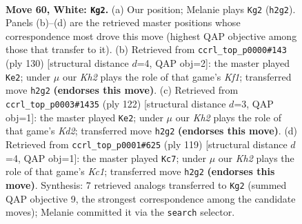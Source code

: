 \documentclass[11pt]{article}
\begin{document}
\clearpage

\begin{figure}[p]\centering
\begin{subfigure}{0.46\textwidth}\centering
\resizebox{\linewidth}{!}{%
\newchessgame
\chessboard[
  setfen={2k5/5R2/2r5/8/8/8/7K/8 w - - 0 60},
  showmover=false,
  pgfstyle=straightmove, color=movearrow, markmove={h2-g2}
]}
\caption{}
\end{subfigure}\hfill
\begin{subfigure}{0.46\textwidth}\centering
\resizebox{\linewidth}{!}{%
\newchessgame
\chessboard[
  setfen={8/8/1R6/6kr/8/8/8/5K2 w - - 1 66},
  showmover=false,
  pgfstyle=straightmove, color=movearrow, markmove={f1-e2}
]}
\caption{}
\end{subfigure}
\\[4pt]
\begin{subfigure}{0.46\textwidth}\centering
\resizebox{\linewidth}{!}{%
\newchessgame
\chessboard[
  setfen={6R1/8/8/2n5/8/r6k/3K4/8 w - - 14 62},
  showmover=false,
  pgfstyle=straightmove, color=movearrow, markmove={d2-e2}
]}
\caption{}
\end{subfigure}\hfill
\begin{subfigure}{0.46\textwidth}\centering
\resizebox{\linewidth}{!}{%
\newchessgame
\chessboard[
  setfen={2k5/8/3r4/8/8/7R/8/2K5 b - - 21 60},
  showmover=false,
  pgfstyle=straightmove, color=movearrow, markmove={c8-c7}
]}
\caption{}
\end{subfigure}
\caption{\textbf{Move 60, White: \texttt{Kg2}.} (a) Our position; Melanie plays \texttt{Kg2} (\texttt{h2g2}). Panels (b)--(d) are the retrieved master positions whose correspondence most drove this move (highest QAP objective among those that transfer to it). (b) Retrieved from \texttt{ccrl\_top\_p0000\#143} (ply 130) [structural distance $d$=4, QAP obj=2]: the master played \texttt{Ke2}; under $\mu$ our \emph{Kh2} plays the role of that game's \emph{Kf1}; transferred move \texttt{h2g2} \textbf{(endorses this move)}. (c) Retrieved from \texttt{ccrl\_top\_p0003\#1435} (ply 122) [structural distance $d$=3, QAP obj=1]: the master played \texttt{Ke2}; under $\mu$ our \emph{Kh2} plays the role of that game's \emph{Kd2}; transferred move \texttt{h2g2} \textbf{(endorses this move)}. (d) Retrieved from \texttt{ccrl\_top\_p0001\#625} (ply 119) [structural distance $d$=4, QAP obj=1]: the master played \texttt{Kc7}; under $\mu$ our \emph{Kh2} plays the role of that game's \emph{Kc1}; transferred move \texttt{h2g2} \textbf{(endorses this move)}. Synthesis: 7 retrieved analogs transferred to \texttt{Kg2} (summed QAP objective 9, the strongest correspondence among the candidate moves); Melanie committed it via the \texttt{search} selector.}
\label{fig:thought-m118}
\end{figure}
\end{document}
